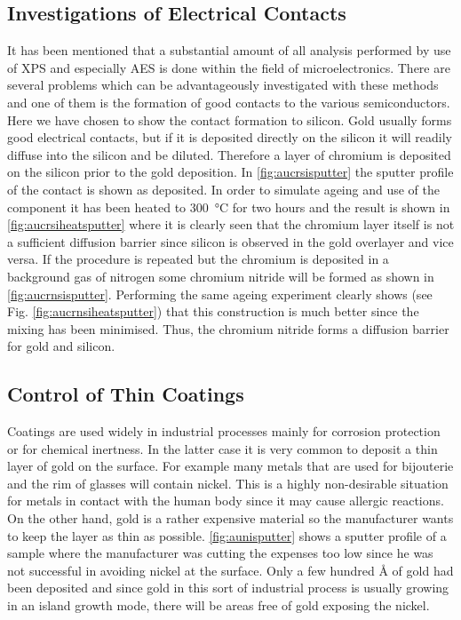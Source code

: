 \subsection{Investigations of Electrical Contacts}
It has been mentioned that a substantial amount of all analysis performed by use of XPS and especially AES is done within the field of microelectronics. There are several problems which can be advantageously investigated with these methods and one of them is the formation of good contacts to the various semiconductors. Here we have chosen to show the contact formation to silicon. Gold usually forms good electrical contacts, but if it is deposited directly on the silicon it will readily diffuse into the silicon and be diluted. Therefore a layer of chromium is deposited on the silicon prior to the gold deposition. In \autoref{fig:aucrsisputter} the sputter profile of the contact is shown as deposited. In order to simulate ageing and use of the component it has been heated to \SI{300}{\degreeCelsius} for two hours and the result is shown in \autoref{fig:aucrsiheatsputter} where it is clearly seen that the chromium layer itself is not a sufficient diffusion barrier since silicon is observed in the gold overlayer and vice versa. If the procedure is repeated but the chromium is deposited in a background gas of nitrogen some chromium nitride will be formed as shown in \autoref{fig:aucrnsisputter}. Performing the same ageing experiment clearly shows (see Fig. \ref{fig:aucrnsiheatsputter}) that this construction is much better since the mixing has been minimised. Thus, the chromium nitride forms a diffusion barrier for gold and silicon.

\subsection{Control of Thin Coatings}
Coatings are used widely in industrial processes mainly for corrosion protection or for chemical inertness. In the latter case it is very common to deposit a thin layer of gold on the surface. For example many metals that are used for bijouterie and the rim of glasses will contain nickel. This is a highly non-desirable situation for metals in contact with the human body since it may cause allergic reactions. On the other hand, gold is a rather expensive material so the manufacturer wants to keep the layer as thin as possible. \autoref{fig:aunisputter} shows a sputter profile of a sample where the manufacturer was cutting the expenses too low since he was not successful in avoiding nickel at the surface. Only a few hundred \si{\angstrom} of gold had been deposited and since gold in this sort of industrial process is usually growing in an island growth mode, there will be areas free of gold exposing the nickel.

